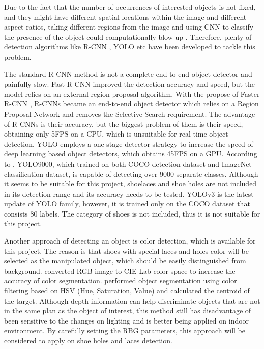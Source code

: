 Due to the fact that the number of occurrences of interested objects is not fixed, and they might have different spatial locations within the image and different aspect ratios, taking different regions from the image and using CNN to classify the presence of the object could computationally blow up \citep{RCNNFast65:online}. Therefore, plenty of detection algorithms like R-CNN \citep{RCNN}, YOLO \citep{YOLO} etc have been developed to tackle this problem. 

The standard R-CNN method is not a complete end-to-end object detector and painfully slow. Fast R-CNN \citep{FastRCNN} improved the detection accuracy and speed, but the model relies on an external region proposal algorithm. With the propose of Faster R-CNN \citep{FasterRCNN}, R-CNNs became an end-to-end object detector which relies on a Region Proposal Network and removes the Selective Search requirement. The advantage of R-CNNs is their accuracy, but the biggest problem of them is their speed, obtaining only 5FPS on a CPU, which is unsuitable for real-time object detection. YOLO employs a one-stage detector strategy to increase the speed of deep learning based object detectors, which obtains 45FPS on a GPU. According to \citep{YOLO9000}, YOLO9000, which trained on both COCO detection dataset and ImageNet classification dataset, is capable of detecting over 9000 separate classes. Although it seems to be suitable for this project, shoelaces and shoe holes are not included in its detection range and its accuracy needs to be tested. YOLOv3 \citep{YOLOv3} is the latest update of YOLO family, however, it is trained only on the COCO dataset that consists 80 labels. The category of shoes is not included, thus it is not suitable for this project. 

Another approach of detecting an object is color detection, which is available for this project. The reason is that shoes with special laces and holes color will be selected as the manipulated object, which should be easily distinguished from background. \citep{cie} converted RGB image to CIE-Lab color space to increase the accuracy of color segmentation. \citep{HSV} performed object segmentation using color filtering based on HSV (Hue, Saturation, Value) and calculated the centroid of the target. Although depth information can help discriminate objects that are not in the same plan as the object of interest, this method still has disadvantage of been sensitive to the changes on lighting and is better being applied on indoor environment. By carefully setting the RBG parameters, this approach will be considered to apply on shoe holes and laces detection.

